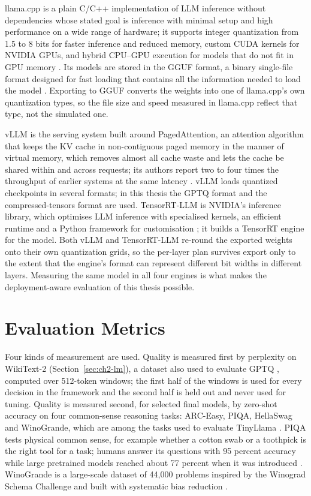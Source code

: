 llama.cpp is a plain C/C++ implementation of LLM inference without dependencies whose stated goal is inference with minimal setup and high performance on a wide range of hardware; it supports integer quantization from 1.5 to 8 bits for faster inference and reduced memory, custom CUDA kernels for NVIDIA GPUs, and hybrid CPU--GPU execution for models that do not fit in GPU memory \cite{ggml2025llamacpp}. Its models are stored in the GGUF format, a binary single-file format designed for fast loading that contains all the information needed to load the model \cite{ggml2025gguf}. Exporting to GGUF converts the weights into one of llama.cpp's own quantization types, so the file size and speed measured in llama.cpp reflect that type, not the simulated one.

vLLM is the serving system built around PagedAttention, an attention algorithm that keeps the KV cache in non-contiguous paged memory in the manner of virtual memory, which removes almost all cache waste and lets the cache be shared within and across requests; its authors report two to four times the throughput of earlier systems at the same latency \cite{kwon2023vllm}. vLLM loads quantized checkpoints in several formats; in this thesis the GPTQ format and the compressed-tensors format are used. TensorRT-LLM is NVIDIA's inference library, which optimises LLM inference with specialised kernels, an efficient runtime and a Python framework for customisation \cite{nvidia2025tensorrtllm}; it builds a TensorRT engine for the model. Both vLLM and TensorRT-LLM re-round the exported weights onto their own quantization grids, so the per-layer plan survives export only to the extent that the engine's format can represent different bit widths in different layers. Measuring the same model in all four engines is what makes the deployment-aware evaluation of this thesis possible.

\section{Evaluation Metrics}
\label{sec:ch2-metrics}

Four kinds of measurement are used. Quality is measured first by perplexity on WikiText-2 (Section~\ref{sec:ch2-lm}), a dataset also used to evaluate GPTQ \cite{frantar2023gptq}, computed over 512-token windows; the first half of the windows is used for every decision in the framework and the second half is held out and never used for tuning. Quality is measured second, for selected final models, by zero-shot accuracy on four common-sense reasoning tasks: ARC-Easy, PIQA, HellaSwag and WinoGrande, which are among the tasks used to evaluate TinyLlama \cite{zhang2024tinyllama}. PIQA tests physical common sense, for example whether a cotton swab or a toothpick is the right tool for a task; humans answer its questions with 95 percent accuracy while large pretrained models reached about 77 percent when it was introduced \cite{bisk2020piqa}. WinoGrande is a large-scale dataset of 44{,}000 problems inspired by the Winograd Schema Challenge and built with systematic bias reduction \cite{sakaguchi2020winogrande}.

